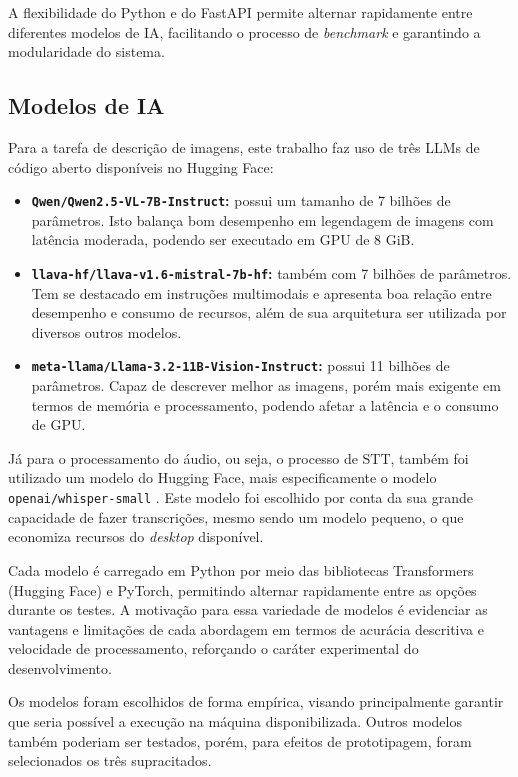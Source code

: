 A flexibilidade do Python e do FastAPI permite alternar rapidamente entre diferentes modelos de IA, facilitando o processo de \textit{benchmark} e garantindo a modularidade do sistema.

\subsection{Modelos de IA}

Para a tarefa de descrição de imagens, este trabalho faz uso de três LLMs de código aberto disponíveis no Hugging Face:

\begin{itemize}
    \item \textbf{\texttt{Qwen/Qwen2.5-VL-7B-Instruct}:} possui um tamanho de 7 bilhões de parâmetros. Isto balança bom desempenho em legendagem de imagens com latência moderada, podendo ser executado em GPU de 8 GiB.
    \item \textbf{\texttt{llava-hf/llava-v1.6-mistral-7b-hf}:} também com 7 bilhões de parâmetros. Tem se destacado em instruções multimodais e apresenta boa relação entre desempenho e consumo de recursos, além de sua arquitetura ser utilizada por diversos outros modelos.
    \item \textbf{\texttt{meta-llama/Llama-3.2-11B-Vision-Instruct}:} possui 11 bilhões de parâmetros. Capaz de descrever melhor as imagens, porém mais exigente em termos de memória e processamento, podendo afetar a latência e o consumo de GPU.
\end{itemize}

Já para o processamento do áudio, ou seja, o processo de STT, também foi utilizado um modelo do Hugging Face, mais especificamente o modelo \texttt{openai/whisper-small} \cite{radford2023}. Este modelo foi escolhido por conta da sua grande capacidade de fazer transcrições, mesmo sendo um modelo pequeno, o que economiza recursos do \textit{desktop} disponível.

Cada modelo é carregado em Python por meio das bibliotecas Transformers (Hugging Face) e PyTorch, permitindo alternar rapidamente entre as opções durante os testes. A motivação para essa variedade de modelos é evidenciar as vantagens e limitações de cada abordagem em termos de acurácia descritiva e velocidade de processamento, reforçando o caráter experimental do desenvolvimento.

Os modelos foram escolhidos de forma empírica, visando principalmente garantir que seria possível a execução na máquina disponibilizada. Outros modelos também poderiam ser testados, porém, para efeitos de prototipagem, foram selecionados os três supracitados.

